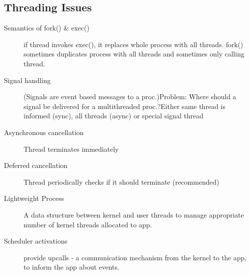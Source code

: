 \subsection*{Threading Issues}
\begin{description}
\item[Semantics of fork() \& exec()] if thread invokes exec(), it replaces whole process with all threads. fork() sometimes duplicates process with all threads and sometimes only calling thread.
  \item[Signal handling] (Signals are event based messages to a proc.)Problem: Where should a signal be delivered for a multithreaded proc.?Either same thread is informed (sync), all threads (async) or special signal thread
  \item[Asynchronous cancellation] Thread terminates immediately
  \item[Deferred cancellation] Thread periodically checks if it should terminate (recommended)
  \item[Lightweight Process] A data structure between kernel and user threads to manage appropriate number of kernel threads allocated to app.
  \item[Scheduler activations] provide upcalls - a communication mechanism from the kernel to the app, to inform the app about events.
\end{description}
